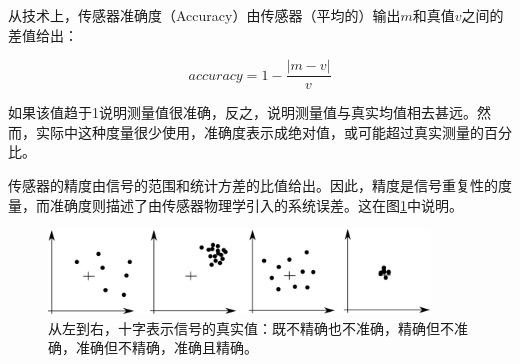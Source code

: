 
从技术上，传感器准确度（Accuracy）由传感器（平均的）输出$m$和真值$v$之间的差值给出：

\begin{equation}
accuracy=1-\frac{|m-v|}{v}
\end{equation}


如果该值趋于1说明测量值很准确，反之，说明测量值与真实均值相去甚远。然而，实际中这种度量很少使用，准确度表示成绝对值，或可能超过真实测量的百分比。


传感器的精度由信号的范围和统计方差的比值给出。因此，精度是信号重复性的度量，而准确度则描述了由传感器物理学引入的系统误差。这在图\ref{fig:precision}中说明。

\begin{figure}
	\centering
		\includegraphics[width=0.9\textwidth]{figs/precisionvsaccuracy.png}
	\caption{从左到右，十字表示信号的真实值：既不精确也不准确，精确但不准确，准确但不精确，准确且精确。
	\label{fig:precision}}
\end{figure}


